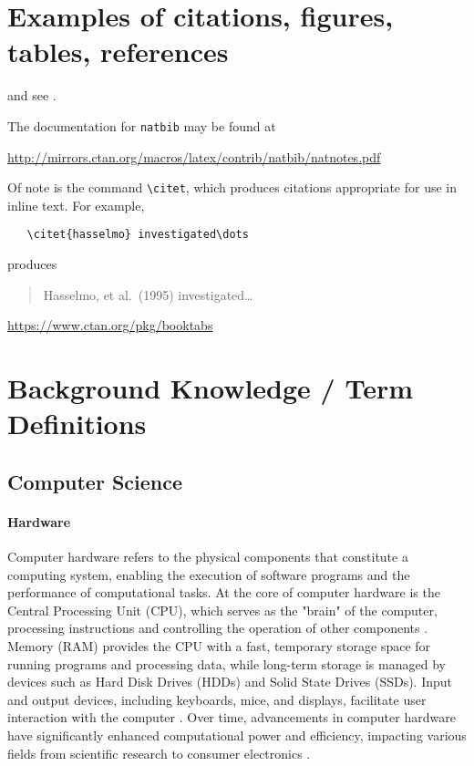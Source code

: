 \documentclass{article}
\begin{document}
\section{Examples of citations, figures, tables, references}
\label{sec:others}
\lipsum[8] \cite{kour2014real,kour2014fast} and see \cite{hadash2018estimate}.

The documentation for \verb+natbib+ may be found at
\begin{center}
  \url{http://mirrors.ctan.org/macros/latex/contrib/natbib/natnotes.pdf}
\end{center}
Of note is the command \verb+\citet+, which produces citations
appropriate for use in inline text.  For example,
\begin{verbatim}
   \citet{hasselmo} investigated\dots
\end{verbatim}
produces
\begin{quote}
  Hasselmo, et al.\ (1995) investigated\dots
\end{quote}

\begin{center}
  \url{https://www.ctan.org/pkg/booktabs}
\end{center}

  
  

\appendix

\section{Background Knowledge / Term Definitions}
\label{sec:background}

\subsection{Computer Science}

\paragraph{Hardware}
Computer hardware refers to the physical components that constitute a computing system, enabling the execution of software programs and the performance of computational tasks. At the core of computer hardware is the Central Processing Unit (CPU), which serves as the "brain" of the computer, processing instructions and controlling the operation of other components \cite{Stallings2016}. Memory (RAM) provides the CPU with a fast, temporary storage space for running programs and processing data, while long-term storage is managed by devices such as Hard Disk Drives (HDDs) and Solid State Drives (SSDs). Input and output devices, including keyboards, mice, and displays, facilitate user interaction with the computer \cite{HennessyPatterson2017}. Over time, advancements in computer hardware have significantly enhanced computational power and efficiency, impacting various fields from scientific research to consumer electronics \cite{Mack2011}.
\end{document}
